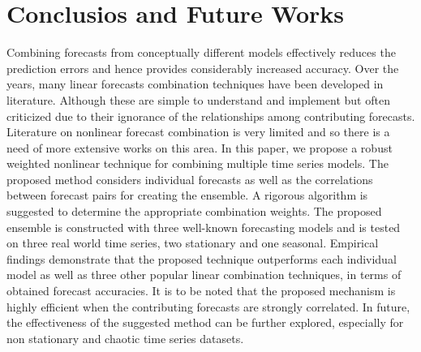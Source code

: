 \section{Conclusios and Future Works}


Combining forecasts from conceptually different models effectively reduces the prediction errors and hence provides
considerably increased accuracy. Over the years, many linear forecasts combination techniques have been developed in literature. Although these are simple to understand and implement but often criticized due to their ignorance of the relationships among contributing forecasts. Literature on nonlinear forecast combination is very limited and so there is a need of more extensive works on this area. In this paper, we propose a robust weighted nonlinear
technique for combining multiple time series models. The proposed method considers individual forecasts as well as the correlations between forecast pairs for creating the ensemble. A rigorous algorithm is suggested to determine the appropriate combination weights. The proposed ensemble is constructed with three well-known forecasting models and is tested on three real world time series, two stationary and one seasonal. Empirical findings demonstrate that the proposed technique outperforms each individual model as well as three other popular linear combination techniques, in terms of obtained forecast accuracies. It is to be noted that the proposed mechanism is highly efficient when the contributing forecasts are strongly correlated. In future, the effectiveness of the suggested method can be further explored, especially for non stationary and chaotic time series datasets. 
